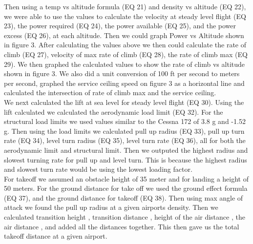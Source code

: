 \documentclass[12pt,A4paper]{article}
\begin{document}
	\indent Then using a temp vs altitude formula (EQ 21) and density vs altitude (EQ 22), we were able to use the values to calculate the velocity at steady level flight (EQ 23), the power required (EQ 24), the power available (EQ 25), and the power excess (EQ 26), at each altitude. Then we could graph Power vs Altitude shown in figure 3. After calculating the values above we then could calculate the rate of climb (EQ 27), velocity of max rate of climb (EQ 28), the rate of climb max (EQ 29). We then graphed the calculated values to show the rate of climb vs altitude shown in figure 3. We also did a unit conversion of 100 ft per second to meters per second, graphed the service ceiling speed on figure 3 as a horizontal line and calculated the intersection of rate of climb max and the service ceiling. \\
	\indent We next calculated the lift at sea level for steady level flight (EQ 30). Using the lift calculated we calculated the aerodynamic load limit (EQ 32). For the structural load limits we used values similar to the Cessna 172 of 3.8 g and -1.52 g. Then using the load limits we calculated pull up radius (EQ 33), pull up turn rate (EQ 34), level turn radius (EQ 35), level turn rate (EQ 36), all for both the aerodynamic limit and structural limit. Then we outputed the highest radius and slowest turning rate for pull up and level turn. This is because the highest radius and slowest turn rate would be using the lowest loading factor. \\
	\indent For takeoff we assumed an obstacle height of 35 meter and for landing a height of 50 meters. For the ground distance for take off we used the ground effect formula (EQ 37), and the ground distance for takeoff (EQ 38). Then using max angle of attack we found the pull up radius at a given airports density. Then we calculated transition height , transition distance , height of the air distance , the air distance , and added all the distances together. This then gave us the total takeoff distance at a given airport.

	\clearpage
\end{document}
